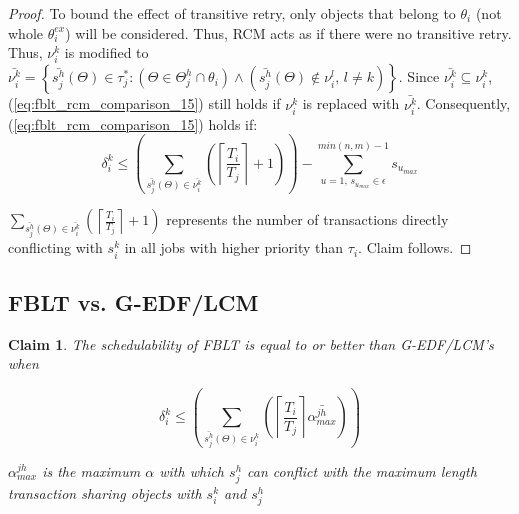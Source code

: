 \documentclass[a4paper,english]{article}
\newtheorem{clm}{Claim}
\newtheorem{proof}{Proof}
\begin{document}
\begin{proof}
To bound the effect of transitive retry, only objects that belong to $\theta_i$ (not whole $\theta_i^{ex}$) will be considered. Thus, RCM acts as if there were no transitive retry.  Thus, $\nu_i^k$ is modified to $\bar{\nu_i^k}=\left\{ \bar{s_{j}^{h}}(\Theta)\in\tau_{j}^{*}:\left(\Theta \in \Theta_j^h \cap \theta_{i}\right)\wedge\left(\bar{s_{j}^{h}}(\Theta)\not\in\nu_{i}^{l},\, l\ne k\right)\right\}$. Since $\bar{\nu_i^k} \subseteq \nu_i^k$, (\ref{eq:fblt_rcm_comparison_15}) still holds if $\nu_i^k$ is replaced with $\bar{\nu_i^k}$.  Consequently, (\ref{eq:fblt_rcm_comparison_15}) holds if: 
\begin{equation}
\delta_i^k\le\left(\sum_{\bar{s_{j}^{h}}(\Theta)\in\bar{\nu_{i}^{k}}}\left(\left\lceil \frac{T_{i}}{T_{j}}\right\rceil +1\right)\right)-\sum_{u=1,\,s_{u_{max}}\in \epsilon}^{min(n,m)-1} s_{u_{max}} \label{eq:fblt_rcm_comparison_16}
\end{equation}

$\sum_{\bar{s_{j}^{h}}(\Theta)\in \bar{\nu_{i}^{k}}}\left(\left\lceil \frac{T_{i}}{T_{j}}\right\rceil +1\right)$
represents the number of transactions directly conflicting with $s_{i}^{k}$ in all jobs with higher priority than $\tau_{i}$. Claim follows.
\end{proof}

\subsection{FBLT vs. G-EDF/LCM}

\begin{clm}\label{clm:fblt_lcm_edf}
The schedulability of FBLT is equal to or better than G-EDF/LCM's when 

\[
\delta_i^k\le\left(\sum_{\bar{s_{j}^{h}}(\Theta)\in\nu_{i}^{k}}\left(\left\lceil \frac{T_{i}}{T_{j}}\right\rceil \bar{\alpha_{max}^{jh}}\right)\right)
\]

$\alpha_{max}^{jh}$ is the maximum $\alpha$ with which $s_{j}^{h}$ can conflict with the maximum length transaction sharing objects with $s_{i}^{k}$ and $s_{j}^{h}$
\end{clm}
\end{document}
